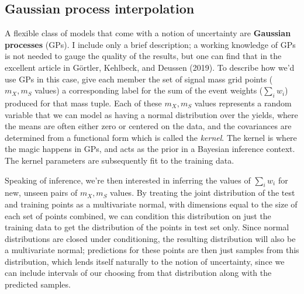 \documentclass[
  11pt,
  numbers=noendperiod]{book}
\begin{document}
\hypertarget{gaussian-process-interpolation}{%
\subsection{Gaussian process
interpolation}\label{gaussian-process-interpolation}}

A flexible class of models that come with a notion of uncertainty are
\textbf{Gaussian processes} (GPs). I include only a brief description; a
working knowledge of GPs is not needed to gauge the quality of the
results, but one can find that in the excellent article in Görtler,
Kehlbeck, and Deussen (2019). To describe how we'd use GPs in this case,
give each member the set of signal mass grid points (\(m_X, m_S\)
values) a corresponding label for the sum of the event weights
(\(\sum_i w_i\)) produced for that mass tuple. Each of these
\(m_X, m_S\) values represents a random variable that we can model as
having a normal distribution over the yields, where the means are often
either zero or centered on the data, and the covariances are determined
from a functional form which is called the \emph{kernel}. The kernel is
where the magic happens in GPs, and acts as the prior in a Bayesian
inference context. The kernel parameters are subsequently fit to the
training data.

Speaking of inference, we're then interested in inferring the values of
\(\sum_i w_i\) for new, unseen pairs of \(m_X, m_S\) values. By treating
the joint distribution of the test and training points as a multivariate
normal, with dimensions equal to the size of each set of points
combined, we can condition this distribution on just the training data
to get the distribution of the points in test set only. Since normal
distributions are closed under conditioning, the resulting distribution
will also be a multivariate normal; predictions for these points are
then just samples from this distribution, which lends itself naturally
to the notion of uncertainty, since we can include intervals of our
choosing from that distribution along with the predicted samples.
\end{document}
